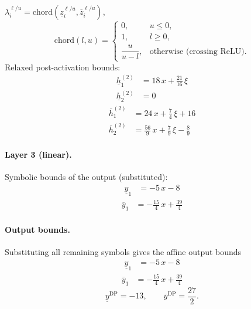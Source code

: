 \documentclass[11pt]{article}
\begin{document}
$\lambda^{\ell/u}_i = \mathrm{chord}(\underline{z}_i^{\ell/u}, \overline{z}_i^{\ell/u})$,
\[
\mathrm{chord}(l, u) =
\begin{cases}
0, & u \le 0,\\
1, & l \ge 0,\\
\dfrac{u}{u - l}, & \text{otherwise (crossing ReLU)}.
\end{cases}\]
Relaxed post-activation bounds:
\begin{align*}
\underline{h}^{(2)}_{1} &= 18\,x + \frac{21}{16}\,\xi \\
\underline{h}^{(2)}_{2} &= 0
\end{align*}
\begin{align*}
\overline{h}^{(2)}_{1} &= 24\,x + \frac{7}{4}\,\xi + 16 \\
\overline{h}^{(2)}_{2} &= \frac{56}{9}\,x + \frac{7}{9}\,\xi - \frac{8}{9}
\end{align*}
\paragraph{Layer 3 (linear).}
Symbolic bounds of the output (substituted):
\begin{align*}
\underline{y}_{1} &= -5\,x - 8
\end{align*}
\begin{align*}
\overline{y}_{1} &= -\frac{15}{4}\,x + \frac{39}{4}
\end{align*}
\paragraph{Output bounds.}
Substituting all remaining symbols gives the affine output bounds
\begin{align*}
\underline{y}_{1} &= -5\,x - 8
\end{align*}
\begin{align*}
\overline{y}_{1} &= -\frac{15}{4}\,x + \frac{39}{4}
\end{align*}
\begin{equation*}
\underline{y}^{\text{DP}} = -13, \qquad \overline{y}^{\text{DP}} = \frac{27}{2}.
\end{equation*}
\end{document}
